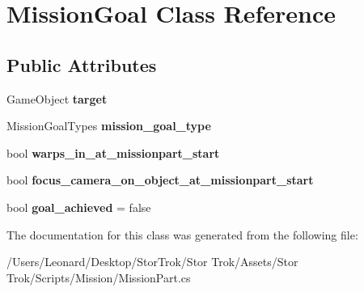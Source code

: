 \hypertarget{class_mission_goal}{}\section{Mission\+Goal Class Reference}
\label{class_mission_goal}
\subsection*{Public Attributes}
\begin{DoxyCompactItemize}
\item 
\mbox{\label{class_mission_goal_a9966e7c7f87310cf5ee05d1b82c14d58}} 
Game\+Object {\bfseries target}
\item 
\mbox{\label{class_mission_goal_af6c0889b1323e84b5d807b7cac66dae6}} 
Mission\+Goal\+Types {\bfseries mission\+\_\+goal\+\_\+type}
\item 
\mbox{\label{class_mission_goal_a98bf20ed825965d862be7e4b483f088f}} 
bool {\bfseries warps\+\_\+in\+\_\+at\+\_\+missionpart\+\_\+start}
\item 
\mbox{\label{class_mission_goal_a0aa2cc35db69de3bf290e8a63d457f86}} 
bool {\bfseries focus\+\_\+camera\+\_\+on\+\_\+object\+\_\+at\+\_\+missionpart\+\_\+start}
\item 
\mbox{\label{class_mission_goal_a8a46e7994b5b75ebb35b67ec459f6344}} 
bool {\bfseries goal\+\_\+achieved} = false
\end{DoxyCompactItemize}


The documentation for this class was generated from the following file\+:\begin{DoxyCompactItemize}
\item 
/\+Users/\+Leonard/\+Desktop/\+Stor\+Trok/\+Stor Trok/\+Assets/\+Stor Trok/\+Scripts/\+Mission/Mission\+Part.\+cs\end{DoxyCompactItemize}
